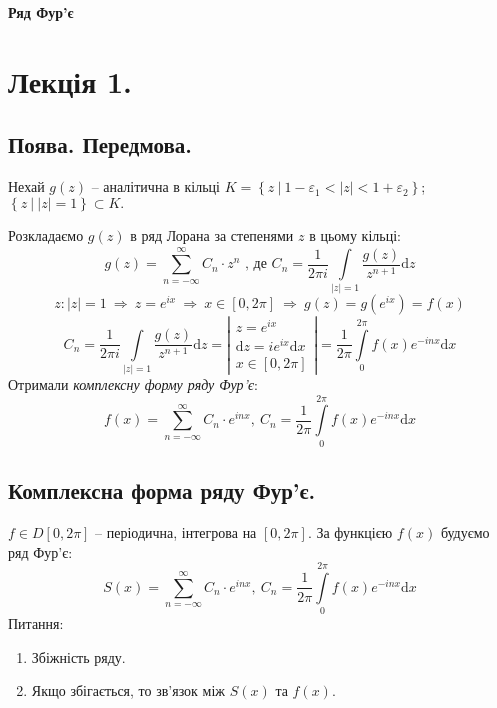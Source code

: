 \documentclass[a4paper]{scrartcl}
\theoremstyle{definition}
\theoremstyle{remark}
\theoremstyle{definition}
\theoremstyle{definition}
\def\i{\infty}                 %
\def\bdash{\ \Big|\  }         %
\begin{document}
\tableofcontents
\newpage

\begin{center}
	\Huge \textbf{Ряд Фур'є}
\end{center}
\par
\section{Лекція 1.}
\subsection{Поява. Передмова.}
Нехай $g(z)$ -- аналітична в  кільці $K = \left\lbrace  z \bdash 1 - \varepsilon_1 < |z| < 1 + \varepsilon_2 \right\rbrace$; $ \left\lbrace  z \bdash  |z| = 1 \right\rbrace \subset K.$\par
Розкладаємо $g(z)$ в ряд Лорана за степенями $z $ в цьому кільці:
$$
g(z) =  \sum\limits_{n =  - \i}^{ \infty}{ C_n \cdot z^n} \text{ , де } C_n = \frac{1}{2\pi i}  \int\limits_{|z| = 1 }^{ }{ \frac{ g(z)}{z^{n+1} }  \mathrm{d} z}
$$
$$
z : |z| =1 \ \Longrightarrow \  z = e^{ix} \ \Longrightarrow \  x \in  [0, 2 \pi]
 \ \Longrightarrow \
g(z) = g(e^{ix}) = f(x)
$$
$$
C_n = \frac{1}{2\pi i}  \int\limits_{|z| = 1 }^{ }{ \frac{ g(z)}{z^{n+1} }  \mathrm{d} z} = \left|  \begin{gathered}
  z = e^{ix}\\
  \mathrm{d} z = ie^{ix} \mathrm{d} x \\
  x \in [0, 2\pi]
\end{gathered} \right| = \frac{1}{2\pi}  \int\limits_{0}^{ 2 \pi}{ f(x) e^{-inx} \mathrm{d} x}
$$
Отримали \textit{комплексну форму ряду Фур'є}:
$$
f(x) =  \sum\limits_{n =-\i }^{ \infty}{C_n \cdot e^{inx}}, \  C_n =  \frac{1}{2\pi}  \int\limits_{0}^{ 2 \pi}{ f(x) e^{-inx} \mathrm{d} x}
$$
\subsection{Комплексна форма ряду Фур'є.}

$f \in D[0, 2\pi]$ -- періодична, інтегрова на $[0, 2 \pi]$. За функцією $f(x)$ будуємо ряд Фур'є:
$$
S(x) =  \sum\limits_{n =-\i }^{ \infty}{C_n \cdot e^{inx}}, \  C_n =  \frac{1}{2\pi}  \int\limits_{0}^{ 2 \pi}{ f(x) e^{-inx} \mathrm{d} x}
$$
Питання:
\begin{enumerate}
  \item  Збіжність ряду.
\item  Якщо збігається, то зв'язок між $S(x)$ та $f(x)$.
\end{enumerate}
\end{document}
